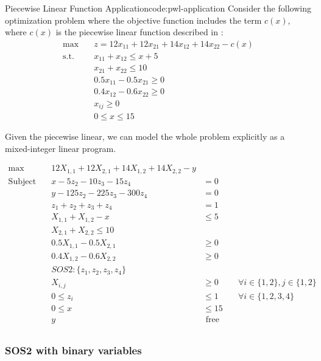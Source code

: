 \begin{examplewithcode}{Piecewise Linear Function Application}{code:pwl-application}
\label{example:pwl-application}
Consider the following optimization problem where the objective function includes the term $c(x)$, where $c(x)$ is the piecewise linear function described in :
\begin{align}
\max \quad& z = 12x_{11} + 12x_{21} + 14x_{12} + 14x_{22} - c(x)\\
\text{s.t.} \quad & x_{11} + x_{12} \leq x + 5\\
& x_{21} + x_{22} \leq 10\\
& 0.5 x_{11} - 0.5x_{21} \geq 0\\
& 0.4 x_{12} - 0.6 x_{22} \geq 0\\
& x_{ij} \geq 0\\
& 0 \leq x \leq 15
\end{align}

Given the piecewise linear, we can model the whole problem explicitly as a mixed-integer linear program.

 \begin{equation}
 \begin{array}{rrlr}
 \max\quad & 12 X_{1,1} + 12 X_{2,1} + 14 X_{1,2} + 14 X_{2,2} - y\\
\text{Subject to} \quad & x - 5 z_{2} - 10 z_{3} - 15 z_{4} &= 0\\
 & y - 125 z_{2} - 225 z_{3} - 300 z_{4} &= 0\\
 & z_{1} + z_{2} + z_{3} + z_{4} &= 1\\
 & X_{1,1} + X_{1,2} - x &\leq 5\\
 & X_{2,1} + X_{2,2} \leq 10\\
 & 0.5 X_{1,1} - 0.5 X_{2,1} &\geq 0\\
 & 0.4 X_{1,2} - 0.6 X_{2,2} &\geq 0\\
 & SOS2: \{z_1, z_2, z_3, z_4\}\\
 & X_{i,j} &\geq 0 &\quad\forall i \in \{1,2\}, j \in \{1,2\}\\
 & 0 \leq z_{i} &\leq 1 &\quad\forall i \in \{1,2,3,4\}\\
 & 0 \leq x &\leq 15\\
 & y & \text{ free} \\
\end{array}
\end{equation}
\end{examplewithcode}


\subsubsection{SOS2 with binary variables}

